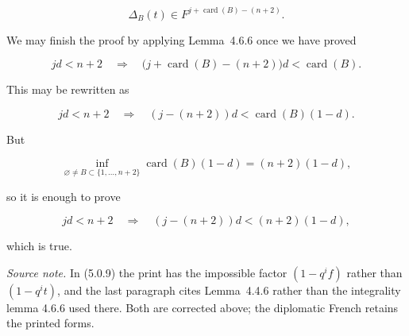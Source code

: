 \begin{equation}\tag{5.0.12}
\Delta_B(t)\in F^{j+\operatorname{card}(B)-(n+2)}.
\end{equation}

We may finish the proof by applying Lemma~4.6.6 once we have proved

\begin{equation}\tag{5.0.13}
jd<n+2
\quad\Longrightarrow\quad
\bigl(j+\operatorname{card}(B)-(n+2)\bigr)d
<\operatorname{card}(B).
\end{equation}

This may be rewritten as

\begin{equation}\tag{5.0.14}
jd<n+2
\quad\Longrightarrow\quad
(j-(n+2))d<\operatorname{card}(B)(1-d).
\end{equation}

But

\[
\inf_{\varnothing\ne B\subset\{1,\ldots,n+2\}}
\operatorname{card}(B)(1-d)
=(n+2)(1-d),
\]

so it is enough to prove

\begin{equation}\tag{5.0.15}
jd<n+2
\quad\Longrightarrow\quad
(j-(n+2))d<(n+2)(1-d),
\end{equation}

which is true.

\medskip
\noindent\emph{Source note.}
In (5.0.9) the print has the impossible factor $(1-q^if)$ rather than
$(1-q^it)$, and the last paragraph cites Lemma~4.4.6 rather than the
integrality lemma 4.6.6 used there.  Both are corrected above; the diplomatic
French retains the printed forms.


